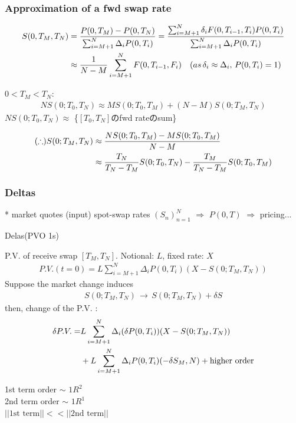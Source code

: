 \documentclass[a4paper,11pt]{jsarticle}
\theoremstyle{definition}
\newcommand{\df}[2]{\dfrac{#1}{#2}}
\begin{document}
\subsubsection{Approximation of a fwd swap rate}
\begin{align}
  S(0,T_M,T_N)&=\df{P(0,T_M)-P(0,T_N)}
  {\sum_{i=M+1}^N \Delta_i P(0,T_i)}
  =\df{\sum_{i=M+1}^N \delta_i F(0,T_{i-1},T_i)P(0,T_i)}
  {\sum_{i=M+1}^N \Delta_i P(0,T_i)} \notag \\
  &\approx \df{1}{N-M} \sum_{i=M+1}^N F(0,T_{i-1},F_i)
  \quad (as \, \delta_i\approx\Delta_i, \, P(0,T_i)=1)
\end{align}

$0<T_M<T_N$:
\begin{align}
  NS(0;T_0,T_N)\approx MS(0;T_0,T_M)+(N-M)S(0;T_M,T_N)
\end{align}
$NS(0;T_0,T_N)\approx$ \{$[T_0,T_N]$のfwd rateのsum\}

\begin{align}
  (\therefore) S(0;T_M,T_N) &\approx
  \df{NS(0;T_0,T_M)-MS(0;T_0,T_M)}{N-M} \notag \\
  &\approx \df{T_N}{T_N-T_M}S(0;T_0,T_N)
  -\df{T_M}{T_N-T_M}S(0;T_0,T_M)
\end{align}


\subsubsection{Deltas}
* market quotes (input) spot-swap rates $(S_n)_{n=1}^N$
$\Rightarrow$ $P(0,T)$ $\Rightarrow$ pricing...

Delas(PVO 1s)


P.V. of receive swap $[T_M, T_N]$.
Notional: $L$, fixed rate: $X$
\begin{align}
  P.V.(t=0)=L\sum_{i=M+1}^N\Delta_i P(0,T_i)(X-S(0;T_M,T_N))
\end{align}
Suppose the market change induces
\begin{align}
  S(0;T_M,T_N) \, \rightarrow \, S(0;T_M,T_N) + \delta S
\end{align}
then, change of the P.V. :
\begin{align}
  \delta P.V.=&L\sum_{i=M+1}^N\Delta_i(\delta P(0,T_i))
  (X-S(0;T_M,T_N)) \notag \\
  &+L\sum_{i=M+1}^N\Delta_i P(0,T_i)
  (-\delta S_M,N) + \mbox{higher order}
\end{align}

1st term order $\sim$ $1R^2$ \\
2nd term order $\sim$ $1R^1$ \\
$||\mbox{1st term}|| << ||\mbox{2nd term}||$
\end{document}
